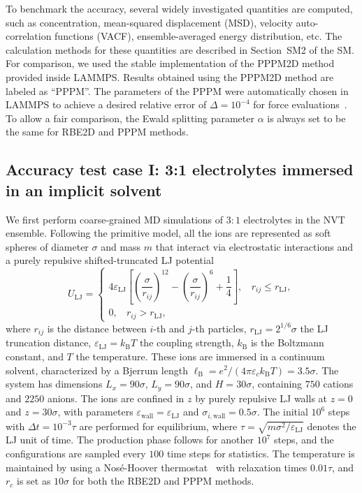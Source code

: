To benchmark the accuracy, several widely investigated quantities are computed, such as concentration, mean-squared displacement (MSD), velocity auto-correlation functions (VACF), ensemble-averaged energy distribution, etc. 
The calculation methods for these quantities are described in Section~SM2 of the SM. 
For comparison, we used the stable implementation of the PPPM2D method~\cite{crozier2001molecular} provided inside LAMMPS. 
Results obtained using the PPPM2D method are labeled as ``PPPM''. 
The parameters of the PPPM were automatically chosen in LAMMPS to achieve a desired relative error of $\Delta=10^{-4}$ for force evaluations~\cite{deserno1998mesh}. 
  {To allow a fair comparison}, the Ewald splitting parameter $\alpha$ is always set to be the same for RBE2D and PPPM methods.

\subsection{Accuracy test case I: 3:1 electrolytes immersed in an implicit solvent}\label{subsec::electrolyte-neutral}
We first perform coarse-grained MD simulations of $3:1$ electrolytes in the NVT ensemble. 
Following the primitive model, all the ions are represented as soft spheres of diameter $\sigma$ and mass $m$ that interact via  {electrostatic interactions} and a purely repulsive shifted-truncated LJ potential
\begin{equation}
	U_{\text{LJ}}=\begin{cases}
		4\varepsilon_{\text{LJ}}\left[\left(\dfrac{\sigma}{r_{ij}}\right)^{12}-\left(\dfrac{\sigma}{r_{ij}}\right)^6+\dfrac{1}{4}\right],~~~~r_{ij}\leq r_{\text{LJ}},\\
		0,~~~~r_{ij}>r_{\text{LJ}},	
	\end{cases}
\end{equation}
where $r_{ij}$ is the distance between $i$-th and $j$-th particles, $r_{\text{LJ}}=2^{1/6}\sigma$ the LJ truncation distance, $\varepsilon_{\text{LJ}}=k_{\text{B}}T$ the coupling strength, $k_{\text{B}}$ is the Boltzmann constant, and $T$ the temperature. These ions are immersed in a continuum solvent, characterized by a Bjerrum length 
$\ell_{\text{B}}=e^2/(4\pi \varepsilon_c k_{\text{B}}T)=3.5\sigma$. The system has dimensions $L_x=90\sigma$, $L_y=90\sigma$, and $H=30\sigma$, containing $750$ cations and $2250$ anions. The ions are confined in $z$ by purely repulsive LJ walls at $z=0$ and $z=30\sigma$, with parameters $\varepsilon_{\text{wall}}=\varepsilon_{\text{LJ}}$ and $\sigma_{i,\text{wall}}=0.5\sigma$. 
The initial $10^6$ steps with $\Delta t=10^{-3}\tau$ are performed for equilibrium, where $\tau=\sqrt{m\sigma^2/\varepsilon_{\text{LJ}}}$ denotes the LJ unit of time. The production phase follows for another $10^7$ steps, and the configurations are sampled every $100$ time steps for statistics. 
The temperature is maintained by using a Nos\'e-Hoover thermostat~\cite{hoover1985canonical} with relaxation times $0.01\tau$, %
and $r_c$ is set as $10\sigma$ for both the RBE2D and PPPM methods.  

